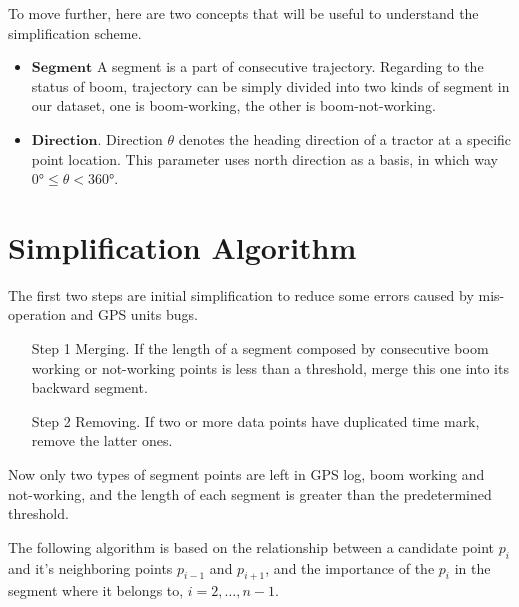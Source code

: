 To move further, here are two concepts that will be useful to understand the simplification scheme.
\begin{itemize}
\item $\mathbf{Segment}$ A segment is a part of consecutive trajectory. Regarding to the status of boom, trajectory can be simply divided into two kinds of segment in our dataset, one is boom-working, the other is boom-not-working. 
\item $\mathbf{Direction}$. Direction $\theta$ denotes the heading direction of a tractor at a specific point location. This parameter uses north direction as a basis, in which way $\ang{0} \leq \theta < \ang{360}$.
\end{itemize}



\section{Simplification Algorithm}

The first two steps are initial simplification to reduce some errors caused by mis-operation and GPS units bugs.
\begin{itemize}
\item[Step 1] Merging. If the length of a segment composed by consecutive boom working or not-working points is less than a threshold, merge this one into its backward segment. 
\item[Step 2] Removing. If two or more data points have duplicated time mark, remove the latter ones. 
\end{itemize}
Now only two types of segment points are left in GPS log, boom working and not-working, and the length of each segment is greater than the predetermined threshold.

The following algorithm is based on the relationship between a candidate point $p_i$ and it's neighboring points $p_{i-1}$ and $p_{i+1}$, and the importance of the $p_i$ in the segment where it belongs to, $i=2,\ldots,n-1$. 

